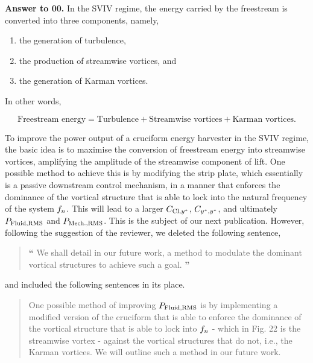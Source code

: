 \documentclass[10pt]{article}
\newcounter{question}
\newcommand{\name}{00}
\newcommand{\question}[1]{\refstepcounter{question} \noindent \textbf{Comment \name.\thequestion}\vskip 0.25cm \noindent \emph{#1}\\}
\newcommand{\answer}[1]{\noindent \textbf{Answer to \name.\thequestion}\vskip 0.25cm \noindent #1 \mbox{}\\}
\newcommand{\newperson}[2]{\renewcommand{\name}{#2} \setcounter{question}{0} \noindent \textbf{\large Answers to #1} \\}
\begin{document}
\answer{
  In the SVIV regime, the energy carried by the freestream is converted into three components, namely,

  \begin{enumerate}
    \item the generation of turbulence,
    \item the production of streamwise vortices, and
    \item the generation of Karman vortices.
  \end{enumerate}

  \noindent In other words,

  \begin{equation}
    \text{Freestream energy} = \text{Turbulence} + \text{Streamwise vortices} + \text{Karman vortices}.
    \label{eq:freesteamEnergy}
  \end{equation}
  
  \noindent To improve the power output of a cruciform energy harvester in the SVIV regime, the basic idea is to maximise the conversion of freestream energy into streamwise vortices, amplifying the \rms{} amplitude of the streamwise component of lift. One possible method to achieve this is by modifying the strip plate, which essentially is a passive downstream control mechanism, in a manner that enforces the dominance of the vortical structure that is able to lock into the natural frequency of the system $f_{n}$. This will lead to a larger $C_{\text{Cl},y^{*}}$, $C_{y^{*},y^{*}}$, and ultimately $P_{\text{Fluid,RMS}}$ and $P_{\text{Mech.,RMS}}$. This is the subject of our next publication. However, following the suggestion of the reviewer, we deleted the following sentence,


  \begin{quotation}
    {\Large \textbf{``}} We shall detail in our future work, a method to modulate the dominant vortical structures to achieve such a goal. {\Large \textbf{''}}
  \end{quotation}

  \noindent and included the following sentences in its place.

  \begin{quotation}
    \color{blue}
    \noindent One possible method of improving $P_{\text{Fluid,RMS}}$ is by implementing a modified version of the cruciform that is able to enforce the dominance of the vortical structure that is able to lock into $f_{n}$ - which in Fig. 22 is the streamwise vortex - against the vortical structures that do not, i.e., the Karman vortices. We will outline such a method in our future work.
  \end{quotation}
  \color{black}
}
% 
% 
\newpage


\end{document}
